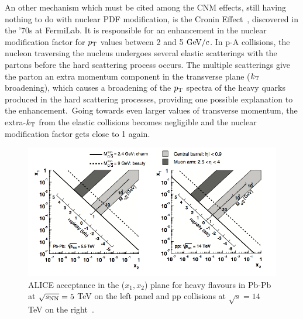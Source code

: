 An other mechanism which must be cited among the CNM effects, still having nothing to do with nuclear PDF modification, is the Cronin Effect~\cite{Cronin:1974zm}, discovered in the ’70s at FermiLab. It is responsible for an enhancement in the nuclear modification factor for $p_{\rm T}$ values between 2 and 5 $\mathrm{GeV}/c$. In p-A collisions, the nucleon traversing the nucleus undergoes several elastic scatterings with the partons before the hard scattering process occurs. The multiple scatterings give the parton an extra momentum component in the transverse plane ($k_{\rm T}$ broadening), which causes a broadening of the $p_{\rm T}$ spectra of the heavy quarks produced in the hard scattering processes, providing one possible explanation to the enhancement.~Going towards even larger values of transverse momentum, the extra-$k_{\rm T}$ from the elastic collisions becomes negligible and the nuclear modification factor gets close to 1 again.\\
\begin{figure}[!ht]
  \centering
  \includegraphics[width=15cm]{FigCap2/xBjork.png}
  \caption{ALICE acceptance in the ($x_1, x_2$) plane for heavy flavours in Pb-Pb at $\sqrt{s_{\rm NN}} = 5$ TeV on the left panel and pp collisions at $\sqrt{s} = 14$ TeV on the right~\cite{Alessandro:2006yt}. }
  \label{fig:xBjork}
\end{figure}



